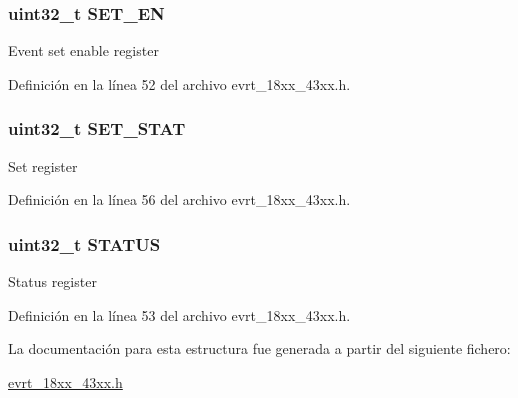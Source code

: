 \subsubsection[{\texorpdfstring{S\+E\+T\+\_\+\+EN}{SET_EN}}]{ uint32\+\_\+t S\+E\+T\+\_\+\+EN}\hypertarget{struct_l_p_c___e_v_r_t___t_ad4ee2600dffc97b5487b479978433ed0}{}\label{struct_l_p_c___e_v_r_t___t_ad4ee2600dffc97b5487b479978433ed0}
Event set enable register 

Definición en la línea 52 del archivo evrt\+\_\+18xx\+\_\+43xx.\+h.

\subsubsection[{\texorpdfstring{S\+E\+T\+\_\+\+S\+T\+AT}{SET_STAT}}]{ uint32\+\_\+t S\+E\+T\+\_\+\+S\+T\+AT}\hypertarget{struct_l_p_c___e_v_r_t___t_aa392d0314798880efcc1243457aad369}{}\label{struct_l_p_c___e_v_r_t___t_aa392d0314798880efcc1243457aad369}
Set register 

Definición en la línea 56 del archivo evrt\+\_\+18xx\+\_\+43xx.\+h.

\subsubsection[{\texorpdfstring{S\+T\+A\+T\+US}{STATUS}}]{ uint32\+\_\+t S\+T\+A\+T\+US}\hypertarget{struct_l_p_c___e_v_r_t___t_aece2c880dc5ba01a2fc9326dc080dc26}{}\label{struct_l_p_c___e_v_r_t___t_aece2c880dc5ba01a2fc9326dc080dc26}
Status register 

Definición en la línea 53 del archivo evrt\+\_\+18xx\+\_\+43xx.\+h.



La documentación para esta estructura fue generada a partir del siguiente fichero\+:\begin{DoxyCompactItemize}
\item 
\hyperlink{evrt__18xx__43xx_8h}{evrt\+\_\+18xx\+\_\+43xx.\+h}\end{DoxyCompactItemize}
